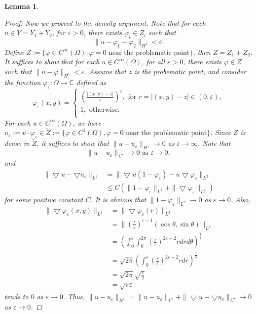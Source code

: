 \documentclass[11pt, a4paper]{amsart}
\newtheorem{lemma}[theorem]{Lemma}
\begin{document}
\begin{lemma}
\begin{proof}
\par
Now we proceed to the density argument. Note that for each $u\in Y=Y_1+Y_2$, for $\varepsilon>0$,  there exists $\varphi_i\in Z_i$ such that $$\|u-\varphi_1-\varphi_2\|_{H^1}<\varepsilon.$$ Define
$Z:=\{\varphi \in C^{\infty}(\Omega)\colon \varphi=0 \mbox{ near the problematic point}\}$, then $Z=Z_1+Z_2$.
 It suffices to show that for each $u\in C^{\infty}(\Omega)$, for all $\varepsilon>0$, there exists $\varphi\in Z$ such that $\|u-\varphi\|_{H^1}<\varepsilon$. Assume that $z$ is the probematic point, and consider the function $\varphi_{\varepsilon}\colon \Omega\to\mathbb{C}$ defined as 
$$\varphi_{\varepsilon}(x,y)=\begin{cases} \left(\frac{|(x,y)-z|}{\varepsilon}\right)^{\varepsilon}, \mbox{ for } r=|(x,y)-z|\in(0,\varepsilon), \\
1,  \mbox{ otherwise}.\\
\end{cases}$$
For each $u\in C^{\infty}(\Omega)$, we have $u_{\varepsilon}:=u\cdot \varphi_{\varepsilon}\in \tilde{Z}:=\{\varphi\in C^1(\Omega),\varphi=0 \mbox{ near the problematic point}\}$. Since $Z$ is dense in $\tilde{Z}$, it suffices to show that $\|u-u_{\varepsilon}\|_{H^1}\to 0$ as $\varepsilon\to\infty$. Note that
$$\|u-u_{\varepsilon}\|_{L^2}\rightarrow 0 \mbox{ as } \varepsilon\rightarrow 0,$$ and 
\begin{align*}
\|\bigtriangledown u-\bigtriangledown u_{\varepsilon}\|_{L^2}&=\| \bigtriangledown u (1-\varphi_{\varepsilon})-u\bigtriangledown \varphi_{\varepsilon}\|_{L^2}\\
{}&\leq C(\|1-\varphi_{\varepsilon}\|_{L^2}+\|\bigtriangledown \varphi_{\varepsilon}\|_{L^2})
\end{align*}
for some positive constant $C$. It is obvious that $\|1-\varphi_{\varepsilon}\|_{L^2}\to 0$ as $\varepsilon\to 0$.
Also,
\begin{align*}
\|\bigtriangledown\varphi_{\varepsilon}(x,y)\|_{L^2}&=\| \bigtriangledown \varphi_{\varepsilon}(r)\|_{L^2}\\
{}&= \| \left(\frac{r}{\varepsilon}\right)^{\varepsilon-1}(\cos\theta, \sin\theta)\|_{L^2}\\
{}&=\left(\int_{0}^{\varepsilon}\int_{0}^{2\pi} \left(\frac{r}{\varepsilon}\right)^{2\varepsilon-2} r dr d\theta\right)^{\frac{1}{2}}\\
{}&=\sqrt{2\pi}\left(\int_{0}^{\varepsilon}\left(\frac{r}{\varepsilon}\right)^{2\varepsilon-2} r dr\right)^{\frac{1}{2}}\\
{}&=\sqrt{2\pi} \sqrt{\frac{\varepsilon}{2}}\\
{}&=\sqrt{\pi \varepsilon}
\end{align*}
tends to $0$ as $\varepsilon\to 0$.
Thus, $\|u-u_{\varepsilon}\|_{H^1}=\|u-u_{\varepsilon}\|_{L^2}+\|\bigtriangledown  u-\bigtriangledown u_{\varepsilon}\|_{L^2}\to 0$ as $\varepsilon\to 0$.
\end{proof}
\end{lemma}
\end{document}
